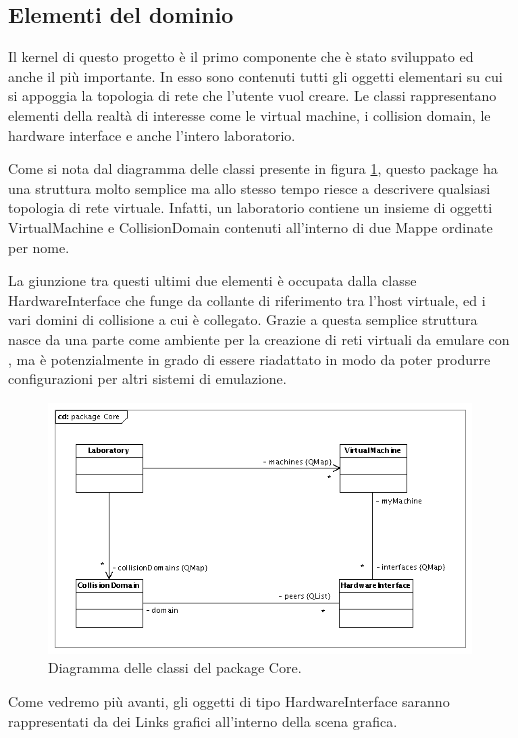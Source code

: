 \subsection{Elementi del dominio}
Il kernel di questo progetto è il primo componente che è stato sviluppato ed anche il più importante. In esso sono contenuti tutti gli oggetti elementari su cui si appoggia la topologia di rete che l'utente vuol creare. Le classi rappresentano elementi della realtà di interesse come le virtual machine, i collision domain, le hardware interface e anche l'intero laboratorio.

Come si nota dal diagramma delle classi presente in figura \ref{figura:uml_package_core}, questo package ha una struttura molto semplice ma allo stesso tempo riesce a descrivere qualsiasi topologia di rete virtuale. Infatti, un laboratorio contiene un insieme di oggetti VirtualMachine e CollisionDomain contenuti all'interno di due Mappe ordinate per nome.

La giunzione tra questi ultimi due elementi è occupata dalla classe HardwareInterface che funge da collante di riferimento tra l'host virtuale, ed i vari domini di collisione a cui è collegato.
Grazie a questa semplice struttura \visualnetkit{} nasce da una parte come ambiente per la creazione di reti virtuali da emulare con \netkit{}, ma è potenzialmente in grado di essere riadattato in modo da poter produrre configurazioni per altri sistemi di emulazione.

\begin{figure}[!htb]
	\centering
	\includegraphics[width=12cm]{images/uml_package_core.png}
	\caption{Diagramma delle classi del package Core.}
	\label{figura:uml_package_core}
\end{figure}


Come vedremo più avanti, gli oggetti di tipo HardwareInterface saranno rappresentati da dei Links grafici all'interno della scena grafica.

